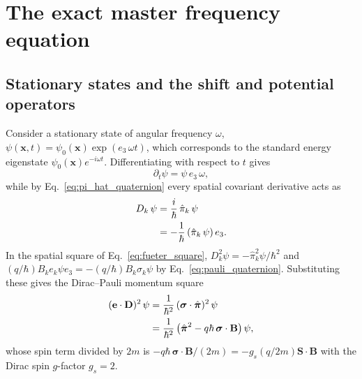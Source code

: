 \documentclass[aps,prd,onecolumn,tightenlines,nofootinbib,notitlepage,11pt,floatfix]{revtex4-2}
\theoremstyle{indentedtheorem}
\begin{document}
\section{The exact master frequency equation}
\label{sec:master}

\subsection{Stationary states and the shift and potential operators}
\label{sec:stationary_block}

Consider a stationary state of angular frequency $\omega$, $\psi(\mathbf{x},t) = \psi_0(\mathbf{x})\exp(e_3\,\omega t)$, which corresponds to the standard energy eigenstate $\psi_0(\mathbf{x})e^{-i\omega t}$. Differentiating with respect to $t$ gives
\begin{equation}
    \partial_t\psi = \psi\,e_3\,\omega ,
    \label{eq:stationary_time}
\end{equation}
while by Eq.~\eqref{eq:pi_hat_quaternion} every spatial covariant derivative acts as
\begin{align}
    D_k\,\psi &= \frac{i}{\hbar}\,\hat{\pi}_k\,\psi \notag\\
    &= -\frac{1}{\hbar}\,(\hat{\pi}_k\,\psi)\,e_3 .
    \label{eq:momentum_reading}
\end{align}
In the spatial square of Eq.~\eqref{eq:fueter_square}, $D_k^2\psi = -\hat{\pi}_k^2\psi/\hbar^2$ and $(q/\hbar)B_k e_k\psi e_3 = -(q/\hbar)B_k\sigma_k\psi$ by Eq.~\eqref{eq:pauli_quaternion}. Substituting these gives the Dirac--Pauli momentum square~\citep{Dirac1928Quantum}
\begin{align}
    (\mathbf{e}\cdot\mathbf{D})^2\,\psi &= \frac{1}{\hbar^2}\,(\boldsymbol{\sigma}\cdot\hat{\boldsymbol{\pi}})^2\,\psi \notag\\
    &= \frac{1}{\hbar^2}\,\big(\hat{\boldsymbol{\pi}}^2 - q\hbar\,\boldsymbol{\sigma}\cdot\mathbf{B}\big)\,\psi ,
    \label{eq:space_square_reading}
\end{align}
whose spin term divided by $2m$ is $-q\hbar\,\boldsymbol{\sigma}\cdot\mathbf{B}/(2m) = -g_s(q/2m)\mathbf{S}\cdot\mathbf{B}$ with the Dirac spin $g$-factor $g_s=2$.
\end{document}

